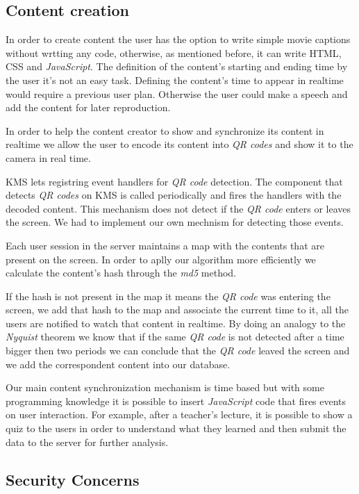 	\subsection{Content creation}

	In order to create content the user has the option to write simple movie captions without wrtting any code, otherwise, as mentioned before, it can write \ac{HTML}, \ac{CSS} and \emph{JavaScript}. The definition of the content's starting and ending time by the user it's not an easy task. Defining the content's time to appear in realtime would require a previous user plan. Otherwise the user could make a speech and add the content for later reproduction.

	In order to help the content creator to show and synchronize its content in realtime we allow the user to encode its content into \emph{QR codes} and show it to the camera in real time.

	\ac{KMS} lets registring event handlers for \emph{QR code} detection. The component that detects \emph{QR codes} on \ac{KMS} is called periodically and fires the handlers with the decoded content. This mechanism does not detect if the \emph{QR code} enters or leaves the screen. We had to implement our own mechnism for detecting those events.

	Each user session in the server maintains a map with the contents that are present on the screen. In order to aplly our algorithm more efficiently we calculate the content's hash through the \emph{md5} method.

	If the hash is not present in the map it means the \emph{QR code} was entering the screen, we add that hash to the map and associate the current time to it, all the users are notified to watch that content in realtime. By doing an analogy to the \emph{Nyquist} theorem we know that if the same \emph{QR code} is not detected after a time bigger then two periods we can conclude that the \emph{QR code} leaved the screen and we add the correspondent content into our database.

	Our main content synchronization mechanism is time based but with some programming knowledge it is possible to insert \emph{JavaScript} code that fires events on user interaction. For example, after a teacher's lecture, it is possible to show a quiz to the users in order to understand what they learned and then submit the data to the server for further analysis.

	\subsection{Security Concerns}

